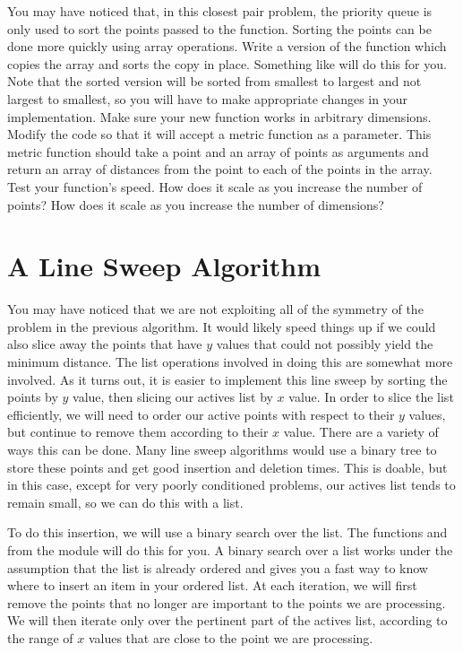 \begin{problem}
You may have noticed that, in this closest pair problem, the priority queue is only used to sort the points passed to the function. 
Sorting the points can be done more quickly using array operations. 
Write a version of the function which copies the array and sorts the copy in place. 
Something like  will do this for you. 
Note that the sorted version will be sorted from smallest to largest and not largest to smallest, so you will have to make appropriate changes in your implementation.
Make sure your new function works in arbitrary dimensions. 
Modify the code so that it will accept a metric function as a parameter.
This metric function should take a point and an array of points as arguments and return an array of distances from the point to each of the points in the array. 
Test your function's speed. 
How does it scale as you increase the number of points? 
How does it scale as you increase the number of dimensions?
\end{problem}

\section*{A Line Sweep Algorithm}

You may have noticed that we are not exploiting all of the symmetry of the problem in the previous algorithm. 
It would likely speed things up if we could also slice away the points that have $y$ values that could not possibly yield the minimum distance. 
The list operations involved in doing this are somewhat more involved. 
As it turns out, it is easier to implement this line sweep by sorting the points by $y$ value, then slicing our actives list by $x$ value.
In order to slice the list efficiently, we will need to order our active points with respect to their $y$ values, but continue to remove them according to their $x$ value. 
There are a variety of ways this can be done. 
Many line sweep algorithms would use a binary tree to store these points and get good insertion and deletion times. 
This is doable, but in this case, except for very poorly conditioned problems, our actives list tends to remain small, so we can do this with a list. 

To do this insertion, we will use a binary search over the list. 
The functions  and  from the  module will do this for you. 
A binary search over a list works under the assumption that the list is already ordered and gives you a fast way to know where to insert an item in your ordered list. 
At each iteration, we will first remove the points that no longer are important to the points we are processing. 
We will then iterate only over the pertinent part of the actives list, according to the range of $x$ values that are close to the point we are processing.

